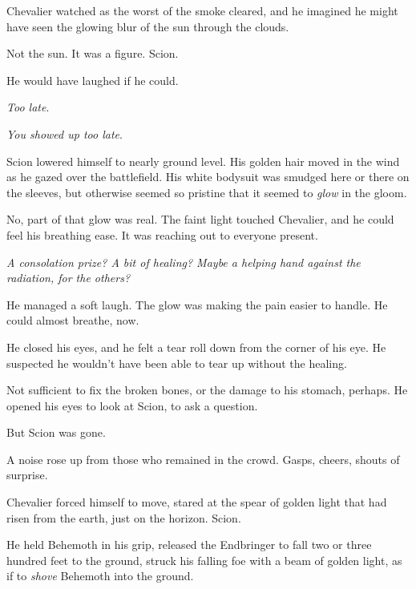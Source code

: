 Chevalier watched as the worst of the smoke cleared, and he imagined he might have seen the glowing blur of the sun through the clouds.



Not the sun.  It was a figure.  Scion.



He would have laughed if he could.



\emph{Too late}.



\emph{You showed up too late}.



Scion lowered himself to nearly ground level.  His golden hair moved in the wind as he gazed over the battlefield.  His white bodysuit was smudged here or there on the sleeves, but otherwise seemed so pristine that it seemed to \emph{glow} in the gloom.



No, part of that glow was real.  The faint light touched Chevalier, and he could feel his breathing ease.  It was reaching out to everyone present.



\emph{A consolation prize?  A bit of healing?  Maybe a helping hand against the radiation, for the others?}



He managed a soft laugh.  The glow was making the pain easier to handle.  He could almost breathe, now.



He closed his eyes, and he felt a tear roll down from the corner of his eye.  He suspected he wouldn't have been able to tear up without the healing.



Not sufficient to fix the broken bones, or the damage to his stomach, perhaps.  He opened his eyes to look at Scion, to ask a question.



But Scion was gone.



A noise rose up from those who remained in the crowd.  Gasps, cheers, shouts of surprise.



Chevalier forced himself to move, stared at the spear of golden light that had risen from the earth, just on the horizon.  Scion.



He held Behemoth in his grip, released the Endbringer to fall two or three hundred feet to the ground, struck his falling foe with a beam of golden light, as if to\emph{ shove} Behemoth into the ground.




